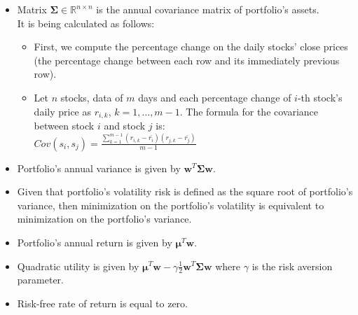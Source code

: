 \documentclass{beamer}
\begin{document}
\begin{frame}


\begin{itemize}
	\justifying
	\item Matrix $\mathbf{\Sigma} \in \mathbb{R}^{n \times n}$ is the annual covariance matrix of portfolio's assets.\\
	It is being calculated as follows:\\
	\begin{itemize}
		\item First, we compute the percentage change on the daily stocks' close prices (the percentage change between each row and its immediately previous row).
		\item Let $n$ stocks, data of $m$ days and each percentage change of $i$-th stock's daily price as $r_{i,k}$, $k = 1, \dots, m-1$. The formula for the covariance between stock $i$ and stock $j$ is:\\
	$Cov(s_i,s_j) = \frac{\sum_{k=1}^{m-1}{(r_{i,k} - \bar{r_{i}})(r_{j,k} - \bar{r_{j}})}}{m-1}$
	\end{itemize}
\end{itemize}
	
\end{frame}




\begin{frame}


\begin{itemize}
	\justifying
	\item Portfolio's annual variance is given by $\mathbf{w}^{T}\mathbf{\Sigma}\mathbf{w}$.
	\item Given that portfolio's volatility {risk} is defined as the square root of portfolio's variance, then minimization on the portfolio's volatility is equivalent to minimization on the portfolio's variance.
	\vspace{0.2cm}
	\item Portfolio's annual return is given by $\boldsymbol\mu^{T} \mathbf{w}$.
	\vspace{0.2cm}
	\item Quadratic utility is given by $\boldsymbol\mu^{T} \mathbf{w} - \gamma \frac{1}{2}\mathbf{w}^{T}\mathbf{\Sigma}\mathbf{w}$ where $\gamma$ is the risk aversion parameter.
	\vspace{0.2cm}
	\item Risk-free rate of return is equal to zero.
\end{itemize}



\end{frame}
\end{document}
